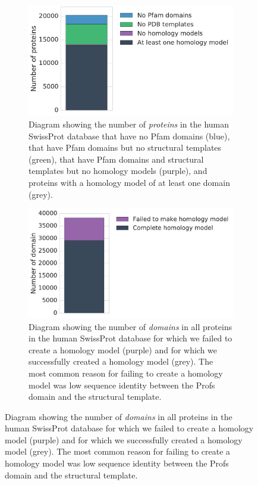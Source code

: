 \begin{figure}[!tb]
	\centering

	\begin{subfigure}[t]{0.48\textwidth}
		\centering
		\includegraphics[width=1\linewidth]{static/elaspic_training_set/elaspic_statistics/protein_statistics.pdf}
		\caption{Diagram showing the number of \textit{proteins} in the human SwissProt database that have no Pfam domains (blue), that have Pfam domains but no structural templates (green), that have Pfam domains and structural templates but no homology models (purple), and proteins with a homology model of at least one domain (grey).}
		\label{fig:protein_statistics}
	\end{subfigure}%
	\hspace*{5mm}
	\begin{subfigure}[t]{0.48\textwidth}
		\centering
		\includegraphics[width=1\linewidth]{static/elaspic_training_set/elaspic_statistics/domain_statistics.pdf}
		\caption{Diagram showing the number of \textit{domains} in all proteins in the human SwissProt database for which we failed to create a homology model (purple) and for which we successfully created a homology model (grey). The most common reason for failing to create a homology model was low sequence identity between the Profs domain and the structural template.}
		\label{fig:domain_statistics}
	\end{subfigure}
	\vspace*{10mm}


\end{figure}
